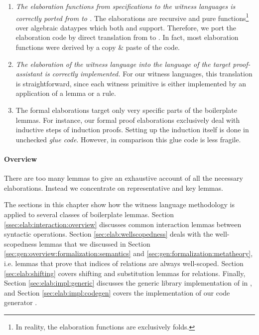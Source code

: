 \begin{enumerate}
\item \emph{The elaboration functions from \Knot specifications to the witness
  languages is correctly ported from \Coq to \Haskell.} The elaborations are
  recursive and pure functions\footnote{In reality, the elaboration functions
    are exclusively folds.} over algebraic dataypes which both \Coq and \Haskell
  support. Therefore, we port the elaboration code by direct translation from
  \Coq to \Haskell. In fact, most \Haskell elaboration functions were derived
  by a copy \& paste of the \Coq code.

\item \emph{The elaboration of the witness language into the language of the
  target proof-assistant is correctly implemented.} For our witness languages,
  this translation is straightforward, since each witness primitive is either
  implemented by an application of a lemma or a rule.

\item The formal elaborations target only very specific parts of the boilerplate
  lemmas. For instance, our formal proof elaborations exclusively deal with
  inductive steps of induction proofs. Setting up the induction itself is done
  in unchecked \emph{glue code}. However, in comparison this glue code is less
  fragile.
\end{enumerate}






\paragraph{Overview}

There are too many lemmas to give an exhaustive account of all the
necessary elaborations. Instead we concentrate on representative and key lemmas.

The sections in this chapter show how the witness language methodology is
applied to several classes of boilerplate lemmas. Section
\ref{ssec:elab:interaction:overview} discusses common interaction lemmas between
syntactic operations. Section \ref{sec:elab:wellscopedness} deals with the
well-scopedness lemmas that we discussed in Section
\ref{sec:gen:overview:formalization:semantics} and
\ref{sec:gen:formalization:metatheory}, i.e. lemmas that prove that indices of
relations are always well-scoped. Section \ref{sec:elab:shifting} covers
shifting and substitution lemmas for relations. Finally, Section
\ref{sec:elab:impl:generic} discusses the generic library implementation \Loom
of \Knot in \Coq, and Section \ref{sec:elab:impl:codegen} covers the
implementation of our code generator \Needle.


